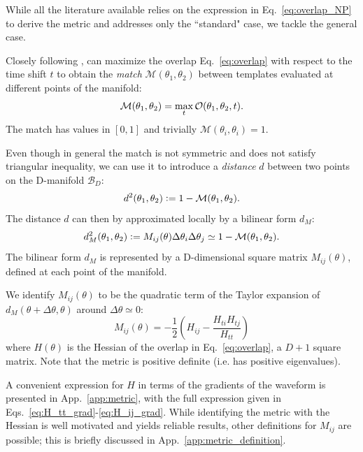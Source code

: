 \documentclass[twocolumn,showpacs,preprintnumbers,nofootinbib,prd,
superscriptaddress,10pt]{revtex4-2}
\begin{document}
While all the literature available \cite{owen_metric, Messenger:2008ta, Prix:2007ks, Brown:2012qf, Roy:2017oul, Coogan:2022qxs, Hanna:2022zpk} relies on the expression in Eq.~\eqref{eq:overlap_NP} to derive the metric and addresses only the ``standard" case, we tackle the general case.

Closely following \cite{owen_metric}, can maximize the overlap Eq.~\eqref{eq:overlap} with respect to the time shift $t$ to obtain the {\it match} $\mathcal{M}(\theta_1,\theta_2)$ between templates evaluated at different points of the manifold:
\begin{equation}\label{eq:match}
	\mathcal{M}(\theta_1,\theta_2) = \max_t \mathcal{O}(\theta_1,\theta_2, t). \\
\end{equation}
%
The match has values in $[0,1]$ and trivially $\mathcal{M}(\theta_i,\theta_i) = 1$.

Even though in general the match is not symmetric and does not satisfy triangular inequality, we can use it to introduce a {\it distance} $d$ between two points on the D-manifold $\mathcal{B}_D$:
\begin{align}\label{eq:distance}
	d^2(\theta_1,\theta_2) \vcentcolon= 1 - \mathcal{M}(\theta_1,\theta_2).
\end{align}
The distance $d$ can then by approximated locally by a bilinear form $d_M$:
\begin{align}\label{eq:metric_definition}
	d_M^2(\theta_1,\theta_2) \vcentcolon= M_{ij}(\theta) \Delta\theta_i \Delta\theta_j \simeq 1 - \mathcal{M}(\theta_1,\theta_2).
\end{align}
The bilinear form $d_M$ is represented by a D-dimensional square matrix $M_{ij}(\theta)$, defined at each point of the manifold.

We identify $M_{ij}(\theta)$ to be the quadratic term of the Taylor expansion of ${d_M(\theta+\Delta\theta,\theta)}$ around $\Delta\theta\simeq 0$:
\begin{equation}\label{eq:metric_expression}
	M_{ij}(\theta) = - \frac{1}{2} \left( H_{ij} - \frac{H_{ti}H_{tj}}{H_{tt}} \right)
\end{equation}
where $H(\theta)$ is the Hessian of the overlap in Eq.~\eqref{eq:overlap}, a $D+1$ square matrix.
Note that the metric is positive definite (i.e. has positive eigenvalues).

A convenient expression for $H$ in terms of the gradients of the waveform is presented in App.~\ref{app:metric}, with the full expression given in Eqs.~\eqref{eq:H_tt_grad}-\eqref{eq:H_ij_grad}.
While identifying the metric with the Hessian is well motivated and yields reliable results, other definitions for $M_{ij}$ are possible; this is briefly discussed in App.~\ref{app:metric_definition}.
\end{document}
